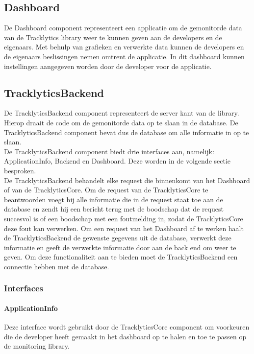 \subsection{Dashboard}
De Dashboard component representeert een applicatie om de gemonitorde data van de Tracklytics library weer te kunnen geven aan de developers en de eigenaars. Met behulp van grafieken en verwerkte data kunnen de developers en de eigenaars beslissingen nemen omtrent de applicatie. In dit dashboard kunnen instellingen aangegeven worden door de developer voor de applicatie. \\

\subsection{TracklyticsBackend}
De TracklyticsBackend component representeert de server kant van de library. Hierop draait de code om de gemonitorde data op te slaan in de database. De TracklyticsBackend component bevat dus de database om alle informatie in op te slaan. \\
De TracklyticsBackend component biedt drie interfaces aan, namelijk: ApplicationInfo, Backend en Dashboard. Deze worden in de volgende sectie besproken.\\

De TracklyticsBackend behandelt elke request die binnenkomt van het Dashboard of van de TracklyticsCore. Om de request van de TracklyticsCore te beantwoorden voegt hij alle informatie die in de request staat toe aan de database en zendt hij een bericht terug met de boodschap dat de request succesvol is of een boodschap met een foutmelding in, zodat de TracklyticsCore deze fout kan verwerken. Om een request van het Dashboard af te werken haalt de TracklyticsBackend de gewenste gegevens uit de database, verwerkt deze informatie en geeft de verwerkte informatie door aan de back end om weer te geven. Om deze functionaliteit aan te bieden moet de TracklyticsBackend een connectie hebben met de database. 



\subsubsection{Interfaces}
\paragraph{ApplicationInfo}
Deze interface wordt gebruikt door de TracklyticsCore component om voorkeuren die de developer heeft gemaakt in het dashboard op te halen en toe te passen op de monitoring library.

